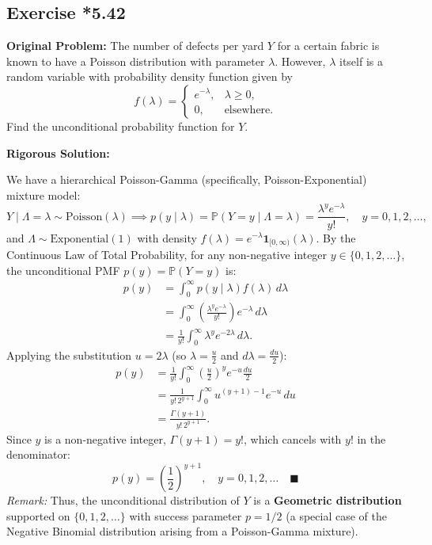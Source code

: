 \documentclass[11pt, letterpaper]{article}
\theoremstyle{definition}
\theoremstyle{remark}
\newcommand{\Prob}{\mathbb{P}}
\begin{document}
\subsection{Exercise *5.42}

\textbf{Original Problem:}
The number of defects per yard $Y$ for a certain fabric is known to have a Poisson distribution with parameter $\lambda$. However, $\lambda$ itself is a random variable with probability density function given by
\[ f(\lambda) = \begin{cases} e^{-\lambda}, & \lambda \ge 0, \\ 0, & \text{elsewhere.} \end{cases} \]
Find the unconditional probability function for $Y$.

\textbf{Rigorous Solution:}

We have a hierarchical Poisson-Gamma (specifically, Poisson-Exponential) mixture model:
\[ Y \mid \Lambda = \lambda \sim \text{Poisson}(\lambda) \implies p(y \mid \lambda) = \Prob(Y = y \mid \Lambda = \lambda) = \frac{\lambda^y e^{-\lambda}}{y!}, \quad y = 0, 1, 2, \dots, \]
and $\Lambda \sim \text{Exponential}(1)$ with density $f(\lambda) = e^{-\lambda} \mathbf{1}_{[0, \infty)}(\lambda)$. By the Continuous Law of Total Probability, for any non-negative integer $y \in \{0, 1, 2, \dots\}$, the unconditional PMF $p(y) = \Prob(Y = y)$ is:
\begin{align*}
    p(y) &= \int_0^\infty p(y \mid \lambda) f(\lambda) \, d\lambda \\
    &= \int_0^\infty \left(\frac{\lambda^y e^{-\lambda}}{y!}\right) e^{-\lambda} \, d\lambda \\
    &= \frac{1}{y!} \int_0^\infty \lambda^y e^{-2\lambda} \, d\lambda.
\end{align*}
Applying the substitution $u = 2\lambda$ (so $\lambda = \frac{u}{2}$ and $d\lambda = \frac{du}{2}$):
\begin{align*}
    p(y) &= \frac{1}{y!} \int_0^\infty \left(\frac{u}{2}\right)^y e^{-u} \frac{du}{2} \\
    &= \frac{1}{y! \, 2^{y+1}} \int_0^\infty u^{(y+1)-1} e^{-u} \, du \\
    &= \frac{\Gamma(y + 1)}{y! \, 2^{y+1}}.
\end{align*}
Since $y$ is a non-negative integer, $\Gamma(y + 1) = y!$, which cancels with $y!$ in the denominator:
\[ p(y) = \left(\frac{1}{2}\right)^{y+1}, \quad y = 0, 1, 2, \dots \quad \blacksquare \]
\textit{Remark:} Thus, the unconditional distribution of $Y$ is a \textbf{Geometric distribution} supported on $\{0, 1, 2, \dots\}$ with success parameter $p = 1/2$ (a special case of the Negative Binomial distribution arising from a Poisson-Gamma mixture).
\end{document}
